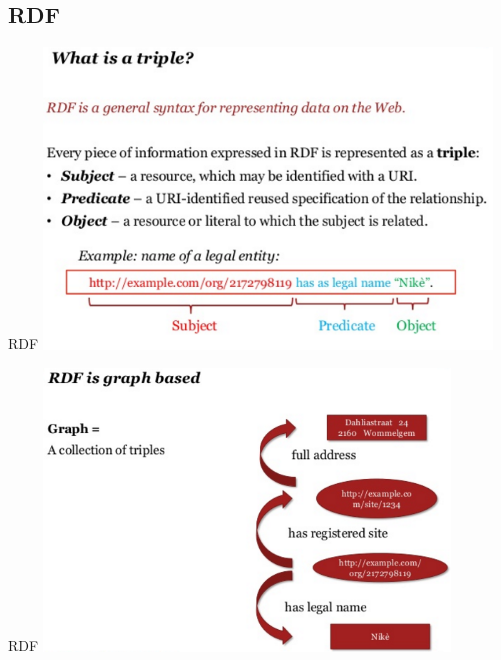 \documentclass[pdf,11pt]{beamer}
\begin{document}
\begin{frame}
\end{frame}


\subsection{RDF}
\begin{frame}{RDF}
\includegraphics[height=8cm]{./1.PNG}
\end{frame}

\begin{frame}{RDF}
\includegraphics[height=7.5cm]{./2.PNG}
\end{frame}

\end{document}
